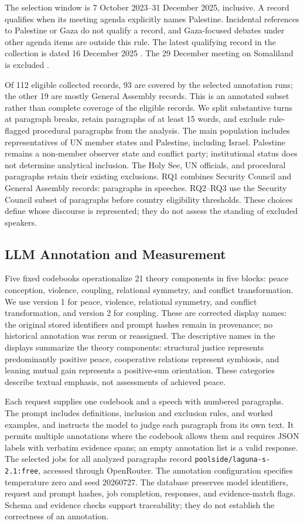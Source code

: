 \documentclass[sigconf,review,anonymous,balance=false]{acmart}
\begin{document}
The selection window is 7 October 2023--31 December 2025, inclusive.
A record qualifies when its meeting agenda explicitly names Palestine.
Incidental references to Palestine or Gaza do not qualify a record, and
Gaza-focused debates under other agenda items are outside this rule.
The latest qualifying record in the collection is dated 16 December 2025
\cite{UNSC10068}. The 29 December meeting on Somaliland is excluded
\cite{UNSC10084}.

Of 112 eligible collected records, 93 are covered by the selected annotation
runs; the other 19 are mostly General Assembly records. This is an
annotated subset rather than complete coverage of the eligible records.
We split substantive turns at paragraph breaks, retain paragraphs of at
least 15 words, and exclude rule-flagged procedural paragraphs from the
analysis. The main population includes representatives of UN member states and
Palestine, including Israel. Palestine remains a non-member observer state
and conflict party; institutional status does not determine analytical
inclusion. The Holy See, UN officials, and procedural paragraphs retain
their existing exclusions. RQ1 combines Security Council and
General Assembly records: \MainParagraphs{} paragraphs in \MainSpeeches{} speeches.
RQ2--RQ3 use the Security Council subset of \SCParagraphs{} paragraphs before
country eligibility thresholds. These choices define whose discourse
is represented; they do not assess the standing of excluded speakers.

\subsection{LLM Annotation and Measurement}
Five fixed codebooks operationalize 21 theory components in five blocks:
peace conception, violence, coupling, relational symmetry, and conflict
transformation. We use version 1 for peace, violence, relational symmetry, and
conflict transformation, and version 2 for coupling. These are corrected display names:
the original stored identifiers and prompt hashes remain in provenance;
no historical annotation was rerun or reassigned. The descriptive names in the
displays summarize the theory components: structural justice represents
predominantly positive peace, cooperative relations represent symbiosis,
and leaning mutual gain represents a positive-sum orientation. These
categories describe textual emphasis,
not assessments of achieved peace.

Each request supplies one codebook and a speech with numbered paragraphs.
The prompt includes definitions, inclusion and exclusion rules, and worked
examples, and instructs the model to judge each paragraph from its own text.
It permits multiple annotations where the codebook allows them and requires
JSON labels with verbatim evidence spans; an empty annotation list is a
valid response. The selected jobs for all analyzed paragraphs record
\texttt{poolside/laguna-s-2.1:free}, accessed through OpenRouter.
The annotation configuration specifies temperature zero and seed 20260727.
The database preserves model identifiers, request and prompt hashes, job
completion, responses, and evidence-match flags. Schema and evidence checks
support traceability; they do not establish the correctness of an annotation.
\end{document}
